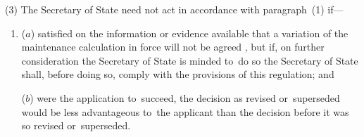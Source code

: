 \documentclass[12pt,a4paper]{article}
\begin{document}
(3) The 
Secretary of State  %
need not act in accordance with paragraph~(1) if—
\begin{enumerate}\item[]
($a$) 
satisfied on the information or evidence available that a variation of the maintenance calculation in force will not be agreed%
, but if, on further consideration 
the Secretary of State  %
is minded to~do so 
the Secretary of State  %
shall, before doing so, comply with the provisions of this regulation; and

($b$) were the application to~succeed, the decision as revised or~superseded would be less advantageous to~the applicant than the decision before it was so revised or~superseded.
\end{enumerate}
\end{document}
